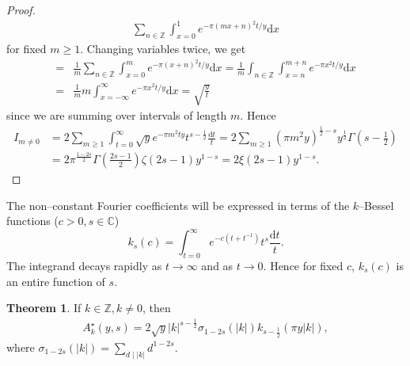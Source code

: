 \documentclass{article}
\theoremstyle{definition}
\newtheorem{theorem}{Theorem}[section]
\begin{document}
\begin{proof}
    \begin{align*}
        \sum_{n \in \mathbb{Z}}^{} \int_{x=0}^{1} e^{-\pi (mx + n)^2 t/y} \mathrm{d}x
    \end{align*} 
    for fixed $m\ge 1$. Changing variables twice, we get 
    \begin{align*}
        =&\frac{1}{m}\sum_{n \in \mathbb{Z}}^{} \int_{x=0}^{m} e^{-\pi (x+n)^2 t/y}\mathrm{d}x = \frac{1}{m}\int_{n \in \mathbb{Z}}^{} \int_{x=n}^{m+n} e^{-\pi x^2 t/y}\mathrm{d}x \\
        =& \frac{1}{m} m \int_{x=-\infty}^{\infty} e^{-\pi x^2 t/y}\mathrm{d}x = \sqrt{\frac{y}{t}}
    \end{align*}
    since we are summing over intervals of length $m$. Hence 
    \begin{align*}
        I_{m \neq 0} &= 2 \sum_{m\ge 1}^{} \int_{t=0}^{\infty} \sqrt{y}e^{-\pi m^2 t y}t^{s-\frac{1}{2}}\frac{\mathrm{d}t}{t} = 2 \sum_{m\ge 1}^{} (\pi m^2 y)^{\frac{1}{2}-s} y^{\frac{1}{2}} \Gamma \left(s-\frac{1}{2}\right) \\
        &= 2 \pi^{\frac{1-2s}{2}} \Gamma \left(\frac{2s-1}{2}\right)\zeta(2s-1)y^{1-s} = 2\xi(2s-1)y^{1-s}.
    \end{align*}
\end{proof}
The non--constant Fourier coefficients will be expressed in terms of the $k$--Bessel functions ($c>0, s \in \mathbb{C}$) \[
k_s(c) = \int_{t=0}^{\infty} e^{-c(t + t^{-1})}t^s\frac{\mathrm{d}t}{t}.
\]
The integrand decays rapidly as $t \to \infty$ and as $t \to 0$. Hence for fixed $c$, $k_s(c)$ is an entire function of $s$.
\begin{theorem}
    If $k \in \mathbb{Z}, k\neq 0$, then 
    \begin{align*}
        A_k^{\star}(y,s) = 2\sqrt{y}|k|^{s-\frac{1}{2}}\sigma_{1-2s}(|k|)k_{s-\frac{1}{2}}(\pi y |k|),
    \end{align*}
    where $\sigma_{1-2s}(|k|) = \sum_{d \mid |k|} d^{1-2s}$.
\end{theorem}
\end{document}

